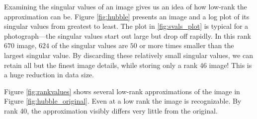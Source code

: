 Examining the singular values of an image gives us an idea of how low-rank the approximation can be.
Figure \ref{fig:hubble} presents an image and a log plot of its singular values from greatest to least.
The plot in \ref{fig:svals_plot} is typical for a photograph---the singular values start out large but drop off rapidly.
In this rank $670$ image, $624$ of the singular values are $50$ or more times smaller than the largest singular value.
By discarding these relatively small singular values, we can retain all but the finest image details, while storing only a rank 46 image!
This is a huge reduction in data size.

Figure \ref{fig:rankvalues} shows several low-rank approximations of the image in Figure \ref{fig:hubble_original}.
Even at a low rank the image is recognizable.
By rank 40, the approximation visibly differs very little from the original.


